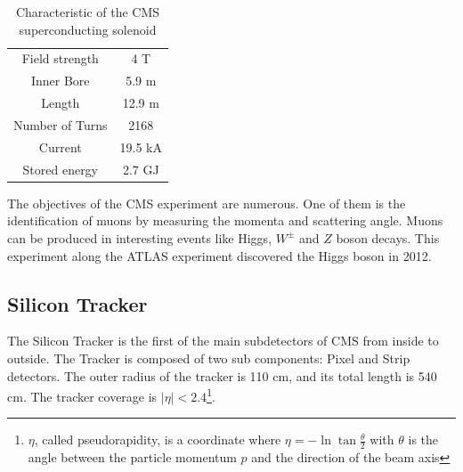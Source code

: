 \begin{table}[ht]
	\caption[Characteristic of the CMS superconducting solenoid]{Characteristic of the CMS superconducting solenoid\cite{cms-manual}}
	\centering
	\begin{tabular}{|c|c|}
		\hline
		Field strength & 4 T \\
		Inner Bore & 5.9 m \\
		Length & 12.9 m\\
		Number of Turns & 2168\\
		Current & 19.5 kA\\
		Stored energy & 2.7 GJ\\
		\hline
	\end{tabular}
	\label{tab:my_label}
\end{table}




 The objectives of the CMS experiment are numerous. One of them is the identification of muons by measuring the momenta and scattering angle. Muons can be produced in interesting events like Higgs, $W^{\pm}$ and $Z$ boson decays. %
This experiment along the ATLAS experiment discovered the Higgs boson in 2012.


\subsection{Silicon Tracker}
The Silicon Tracker is the first of the main subdetectors of CMS from inside to outside. The Tracker is composed of two sub components: Pixel and Strip detectors. The outer radius of the tracker is 110 cm, and its total length is 540 cm. The tracker coverage is $|\eta|<2.4$\footnote{$\eta$, called pseudorapidity, is a coordinate where $\eta=-\ln{\tan{\frac{\theta}{2}}}$ with $\theta$ is the angle between the particle momentum $p$ and the direction of the beam axis}.

